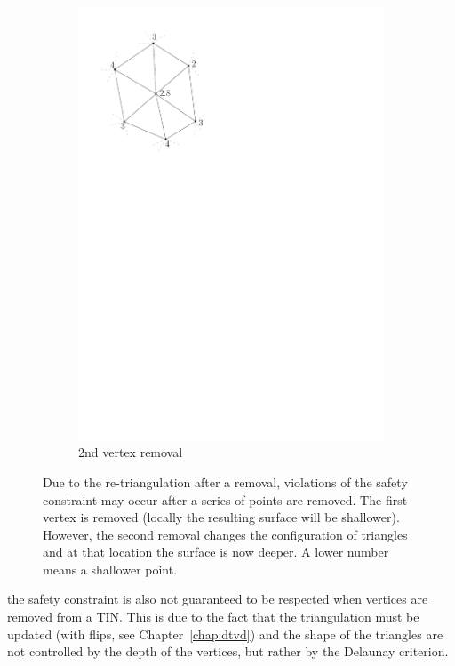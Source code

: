 \begin{figure}
\begin{subfigure}[b]{0.22\linewidth}
    \includegraphics[width=\textwidth,page=3]{figs/simpfail.pdf}
    \caption{2nd vertex removal}\label{fig:simpfail:c}
  \end{subfigure}
\caption{Due to the re-triangulation after a removal, violations of the safety constraint may occur after a series of points are removed. The first vertex is removed (locally the resulting surface will be shallower). However, the second removal changes the configuration of triangles and at that location the surface is now deeper. A lower number means a shallower point.}
\label{fig:simpfail}
\end{figure}
the safety constraint is also not guaranteed to be respected when vertices are removed from a TIN.
This is due to the fact that the triangulation must be updated (with flips, see Chapter~\ref{chap:dtvd}) and the shape of the triangles are not controlled by the depth of the vertices, but rather by the Delaunay criterion.


